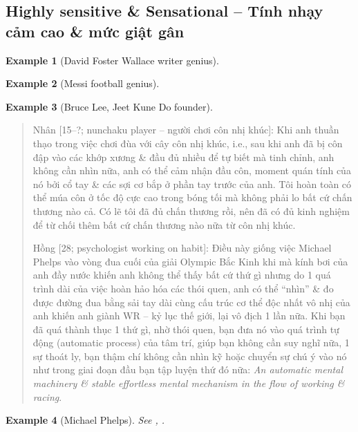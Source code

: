 \documentclass[12pt,oneside]{book}
\newtheorem{example}{Example}
\begin{document}
\subsection{Highly sensitive \& Sensational -- Tính nhạy cảm cao \& mức giật gân}

\begin{example}[{\sc David Foster Wallace} writer genius]
	
\end{example}

\begin{example}[{\sc Messi} football genius]
	
\end{example}

\begin{example}[{\sc Bruce Lee}, Jeet Kune Do founder]
	
\end{example}

\begin{quote}
	{\sf Nhân [15--?; nunchaku player -- người chơi côn nhị khúc]}: Khi anh thuần thạo trong việc chơi đùa với cây côn nhị khúc, i.e., sau khi anh đã bị côn đập vào các khớp xương \& đầu đủ nhiều để tự biết mà tinh chỉnh, anh không cần nhìn nữa, anh có thể cảm nhận đầu côn, moment quán tính của nó bởi cổ tay \& các sợi cơ bắp ở phần tay trước của anh. Tôi hoàn toàn có thể múa côn ở tốc độ cực cao trong bóng tối mà không phải lo bất cứ chấn thương nào cả. Có lẽ tôi đã đủ chấn thương rồi, nên đã có đủ kinh nghiệm để từ chối thêm bất cứ chấn thương nào nữa từ côn nhị khúc.
	
	{\sf Hồng [28; psychologist working on habit]}: Điều này giống việc {\sc Michael Phelps} vào vòng đua cuối của giải Olympic Bắc Kinh khi mà kính bơi của anh đầy nước khiến anh không thể thấy bất cứ thứ gì nhưng do 1 quá trình dài của việc hoàn hảo hóa các thói quen, anh có thể ``nhìn'' \& đo được đường đua bằng sải tay dài cùng cấu trúc cơ thể độc nhất vô nhị của anh khiến anh giành WR -- kỷ lục thế giới, lại vô địch 1 lần nữa. Khi bạn đã quá thành thục 1 thứ gì, nhờ thói quen, bạn đưa nó vào quá trình tự động (automatic process) của tâm trí, giúp bạn không cần suy nghĩ nữa, 1 sự thoát ly, bạn thậm chí không cần nhìn kỹ hoặc chuyển sự chú ý vào nó như trong giai đoạn đầu bạn tập luyện thứ đó nữa: {\it An automatic mental machinery \& stable effortless mental mechanism in the flow of working \& racing}.
\end{quote}

\begin{example}[{\sc Michael Phelps}]
	See {\rm\cite{Duhigg_habit}, \cite[pp. 176--184]{Duhigg_habit_VN}}.
\end{example}
\end{document}
